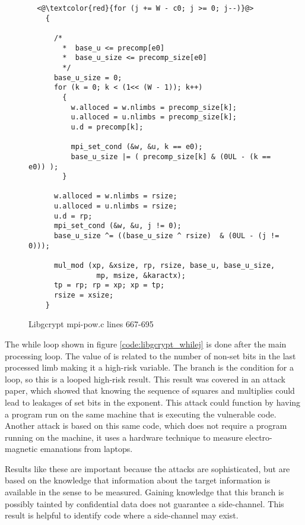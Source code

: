 \begin{figure}[htpb]
\begin{lstlisting}
  <@\textcolor{red}{for (j += W - c0; j >= 0; j--)}@>
    {

      /*
        *  base_u <= precomp[e0]
        *  base_u_size <= precomp_size[e0]
        */
      base_u_size = 0;
      for (k = 0; k < (1<< (W - 1)); k++)
        {
          w.alloced = w.nlimbs = precomp_size[k];
          u.alloced = u.nlimbs = precomp_size[k];
          u.d = precomp[k];

          mpi_set_cond (&w, &u, k == e0);
          base_u_size |= ( precomp_size[k] & (0UL - (k == e0)) );
        }

      w.alloced = w.nlimbs = rsize;
      u.alloced = u.nlimbs = rsize;
      u.d = rp;
      mpi_set_cond (&w, &u, j != 0);
      base_u_size ^= ((base_u_size ^ rsize)  & (0UL - (j != 0)));

      mul_mod (xp, &xsize, rp, rsize, base_u, base_u_size,
                mp, msize, &karactx);
      tp = rp; rp = xp; xp = tp;
      rsize = xsize;
    }
\end{lstlisting}
\caption{Libgcrypt mpi-pow.c lines 667-695}
\label{code:libgcrypt_non_const_for}
\end{figure}

The while loop shown in figure \ref{code:libgcrypt_whilej} is done after the
main processing loop. The value of  is related to the number of
non-set bits in the last processed limb making it a high-risk variable. The
branch is the condition for a loop, so this is a looped high-risk result. This
result was covered in an attack paper, which showed that knowing the sequence of
squares and multiplies could lead to leakages of set bits in the exponent. This
attack could function by having a program run on the same machine that is
executing the vulnerable code\cite{bernstein2017sliding}. Another attack is based on this same code, which
does not require a program running on the machine, it uses a hardware technique
to measure electro-magnetic emanations from laptops\cite{genkin2015stealing}.

Results like these are important because the attacks are sophisticated, but are
based on the knowledge that information about the target information is
available in the sense to be measured. Gaining knowledge that this branch is
possibly tainted by confidential data does not guarantee a side-channel. This
result is helpful to identify code where a side-channel may exist.

